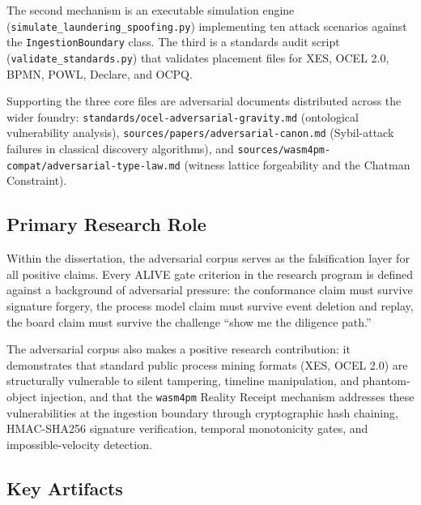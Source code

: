 The second mechanism is an executable simulation engine
(\texttt{simulate\_laundering\_spoofing.py}) implementing ten attack scenarios against the
\texttt{IngestionBoundary} class. The third is a standards audit script
(\texttt{validate\_standards.py}) that validates placement files for XES, OCEL 2.0, BPMN,
POWL, Declare, and OCPQ.

Supporting the three core files are adversarial documents distributed across the wider
foundry: \texttt{standards/ocel-adversarial-gravity.md} (ontological vulnerability analysis),
\texttt{sources/papers/adversarial-canon.md} (Sybil-attack failures in classical discovery
algorithms), and \texttt{sources/wasm4pm-compat/adversarial-type-law.md} (witness lattice
forgeability and the Chatman Constraint).

\subsection{Primary Research Role}
\label{sec:adversarial-identity-role}

Within the dissertation, the adversarial corpus serves as the falsification layer for all
positive claims. Every ALIVE gate criterion in the research program is defined against a
background of adversarial pressure: the conformance claim must survive signature forgery, the
process model claim must survive event deletion and replay, the board claim must survive the
challenge ``show me the diligence path.''

The adversarial corpus also makes a positive research contribution: it demonstrates that
standard public process mining formats (XES, OCEL 2.0) are structurally vulnerable to silent
tampering, timeline manipulation, and phantom-object injection, and that the
\texttt{wasm4pm} Reality Receipt mechanism addresses these vulnerabilities at the ingestion
boundary through cryptographic hash chaining, HMAC-SHA256 signature verification, temporal
monotonicity gates, and impossible-velocity detection.

\subsection{Key Artifacts}
\label{sec:adversarial-identity-artifacts}

